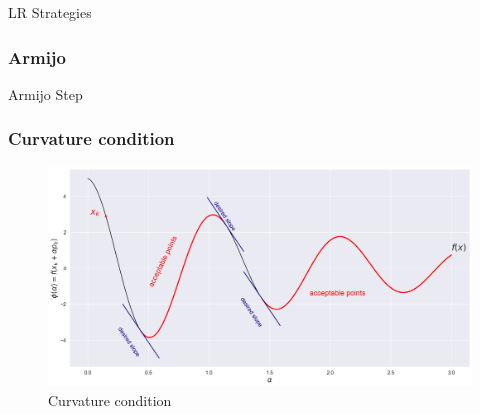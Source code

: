 \documentclass[pdf,10pt]{beamer}
\begin{document}
\begin{section}{LR Strategies}
 \begin{frame}

   \begin{algorithm}[H]
     \frametitle{Armijo}
     \caption{Armijo Step}\label{algo:lr_armijo}
     \begin{algorithmic}[0]

       \State{$\alpha \gets \beta \cdot \alpha$ }
       \If{$\alpha < \epsilon$}
       \State{\Return{$\alpha$}}
       \EndIf{}
       \Else{}
       \State{\Return{$\alpha$}}
       \EndIf{}
       \EndFor{}
       \State{\Return{$\alpha$}}

     \end{algorithmic}
   \end{algorithm}
 \end{frame}




 \begin{frame}
   \frametitle{Curvature condition}
   \begin{figure}[hbt]
     \centering
     \includegraphics[width=\textwidth,keepaspectratio]{../data/curvature.png}
     \caption[Curvature condition]{Curvature condition}\label{fig:curvature}
   \end{figure}
 \end{frame}




\end{section}
\end{document}
